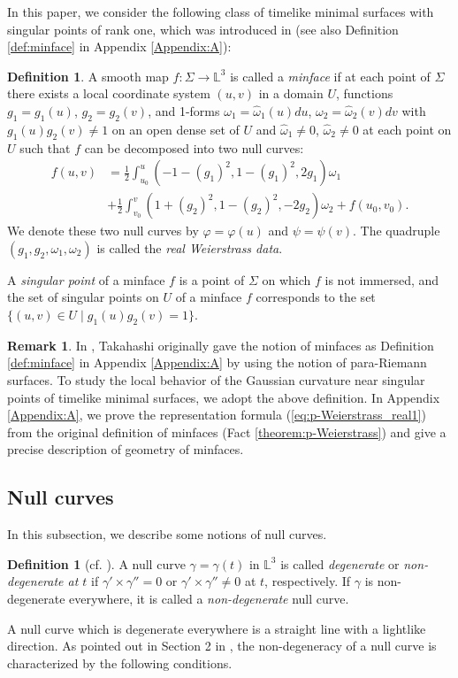 \documentclass[11pt,reqno]{amsart}
\theoremstyle{plain} %
\theoremstyle{definition}
\newtheorem{definition}[theorem]{Definition}
\newtheorem{remark}[theorem]{Remark}
\begin{document}
In this paper, we consider the following class of timelike minimal surfaces with singular points of rank one, which was introduced in \cite{T} (see also Definition \ref{def:minface} in Appendix \ref{Appendix:A}):
\begin{definition}\label{def:minface0}A smooth map $f:\Sigma \longrightarrow \mathbb{L}^3$ is called a {\it minface} if at each point of $\Sigma$ there exists a local coordinate system $(u,v)$ in a domain $U$, functions $g_1=g_1(u)$, $g_2=g_2(v)$, and 1-forms $\omega_1=\hat{\omega}_1(u)du$, $\omega_2=\hat{\omega}_2(v)dv$ with $g_1(u)g_2(v)\neq1$ on an open dense set of $U$ and $\hat{\omega}_1\neq 0$, $\hat{\omega}_2\neq 0$ at each point on $U$ such that $f$ can be decomposed into two null curves:
\begin{align}\label{eq:p-Weierstrass_real1}
  f(u,v)
  &=\frac{1}{2}\int^u_{u_0}\left( -1-(g_1)^2,1-(g_1)^2, 2g_1 \right)\omega_1\nonumber\\
  &+\frac{1}{2}\int^v_{v_0}\left( 1+(g_2)^2,1-(g_2)^2, -2g_2 \right)\omega_2 
    +f(u_0,v_0).
\end{align}
We denote these two null curves by $\varphi=\varphi(u)$ and $\psi=\psi(v)$. The quadruple $(g_1, g_2,\omega_1, \omega_2)$ is called the {\it real Weierstrass data}.
\end{definition}
A {\it singular point} of a minface $f$ is a point of $\Sigma$ on which $f$ is not immersed, and the set of singular points on $U$ of a minface $f$ corresponds to the set $\{(u,v)\in U\mid g_1(u)g_2(v)=1\}$. 
\begin{remark}
In \cite{T}, Takahashi originally gave the notion of minfaces as Definition \ref{def:minface} in Appendix \ref{Appendix:A} by using the notion of para-Riemann surfaces. To study the local behavior of the Gaussian curvature near singular points of timelike minimal surfaces, we adopt the above definition. In Appendix \ref{Appendix:A}, we prove the representation formula (\ref{eq:p-Weierstrass_real1}) from the original definition of minfaces (Fact \ref{theorem:p-Weierstrass}) and give a precise description of geometry of minfaces.
\end{remark}
\subsection{Null curves}\label{subsection:null_curves}
In this subsection, we describe some notions of null curves. 
\begin{definition}[cf. \cite{FKKRSUYY_Okayama,O}]

A null curve $\gamma=\gamma(t)$ in $\mathbb{L}^3$ %
 is called {\it degenerate} or {\it non-degenerate at $t$} if $\gamma'\times \gamma''= 0$ or $\gamma'\times \gamma''\neq 0$ at $t$, respectively. If $\gamma$ is non-degenerate everywhere, it is called a {\it non-degenerate} null curve.
\end{definition} 
A null curve which is degenerate everywhere is a straight line with a lightlike direction. As pointed out in Section 2 in \cite{O}, the non-degeneracy of a null curve is characterized by the following conditions.
\end{document}
